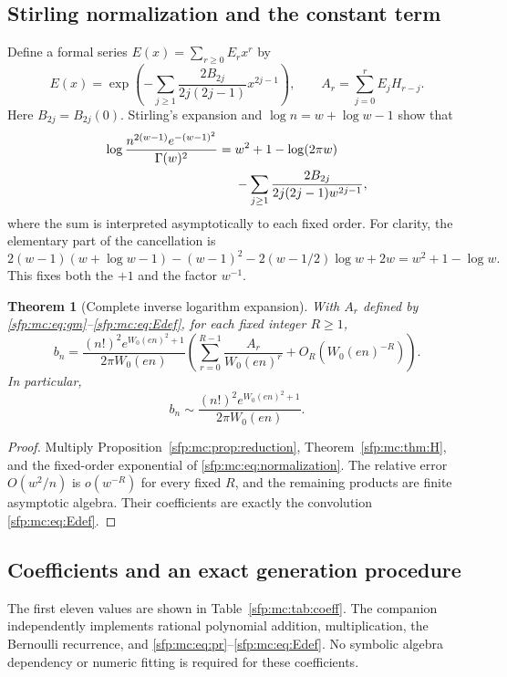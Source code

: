 \documentclass[11pt,letterpaper]{article}
\numberwithin{equation}{section}
\newtheorem{theorem}{Theorem}[section]
\theoremstyle{definition}\newtheorem{definition}[theorem]{Definition}
\theoremstyle{remark}\newtheorem{remark}[theorem]{Remark}
\begin{document}
\subsection{Stirling normalization and the constant term}
Define a formal series $E(x)=\sum_{r\geq0}E_rx^r$ by
\begin{equation}\label{sfp:mc:eq:Edef}
 E(x)=\exp\left(-\sum_{j\geq1}
          \frac{2B_{2j}}{2j(2j-1)}x^{2j-1}\right),\qquad
 A_r=\sum_{j=0}^{r}E_jH_{r-j}.
\end{equation}
Here $B_{2j}=B_{2j}(0)$. Stirling's expansion and
$\log n=w+\log w-1$ show that
\begin{align}
 \log\frac{n^{2(w-1)}e^{-(w-1)^2}}{\Gamma(w)^2}
 ={}&w^2+1-\log(2\pi w)\notag\\
 &-\sum_{j\geq1}\frac{2B_{2j}}{2j(2j-1)w^{2j-1}},
 \label{sfp:mc:eq:normalization}
\end{align}
where the sum is interpreted asymptotically to each fixed order.
For clarity, the elementary part of the cancellation is
\[
 2(w-1)(w+\log w-1)-(w-1)^2
 -2(w-1/2)\log w+2w=w^2+1-\log w.
\]
This fixes both the $+1$ and the factor $w^{-1}$.

\begin{theorem}[Complete inverse logarithm expansion]\label{sfp:mc:thm:main}
With $A_r$ defined by \eqref{sfp:mc:eq:gm}--\eqref{sfp:mc:eq:Edef}, for each
fixed integer $R\geq1$,
\begin{equation}\label{sfp:mc:eq:main}
 b_n=\frac{(n!)^2e^{W_0(en)^2+1}}{2\pi W_0(en)}
 \left(\sum_{r=0}^{R-1}\frac{A_r}{W_0(en)^r}
            +O_R(W_0(en)^{-R})\right).
\end{equation}
In particular,
\begin{equation}\label{sfp:mc:eq:equivalent}
 b_n\sim\frac{(n!)^2e^{W_0(en)^2+1}}{2\pi W_0(en)}.
\end{equation}
\end{theorem}
\begin{proof}
Multiply Proposition~\ref{sfp:mc:prop:reduction},
Theorem~\ref{sfp:mc:thm:H}, and the fixed-order exponential of
\eqref{sfp:mc:eq:normalization}. The relative error $O(w^2/n)$ is
$o(w^{-R})$ for every fixed $R$, and the remaining products are
finite asymptotic algebra. Their coefficients are exactly the
convolution \eqref{sfp:mc:eq:Edef}.
\end{proof}

\subsection{Coefficients and an exact generation procedure}
The first eleven values are shown in Table~\ref{sfp:mc:tab:coeff}.
The companion independently implements rational polynomial
addition, multiplication, the Bernoulli recurrence, and
\eqref{sfp:mc:eq:pr}--\eqref{sfp:mc:eq:Edef}. No symbolic algebra dependency
or numeric fitting is required for these coefficients.
\end{document}
